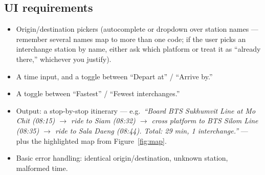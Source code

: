 \documentclass[11pt,a4paper]{article}
\begin{document}
\subsection{UI requirements}
\label{sec:ui}
\begin{itemize}
  \item Origin/destination pickers (autocomplete or dropdown over station
        names --- remember several names map to more than one code; if the
        user picks an interchange station by name, either ask which
        platform or treat it as ``already there,'' whichever you justify).
  \item A time input, and a toggle between ``Depart at'' / ``Arrive by.''
  \item A toggle between ``Fastest'' / ``Fewest interchanges.''
  \item Output: a stop-by-stop itinerary --- e.g.\ \emph{``Board BTS
        Sukhumvit Line at Mo Chit (08:15) $\rightarrow$ ride to Siam
        (08:32) $\rightarrow$ cross platform to BTS Silom Line (08:35)
        $\rightarrow$ ride to Sala Daeng (08:44). Total: 29 min, 1
        interchange.''} --- plus the highlighted map from
        Figure~\ref{fig:map}.
  \item Basic error handling: identical origin/destination, unknown
        station, malformed time.
\end{itemize}
\end{document}
